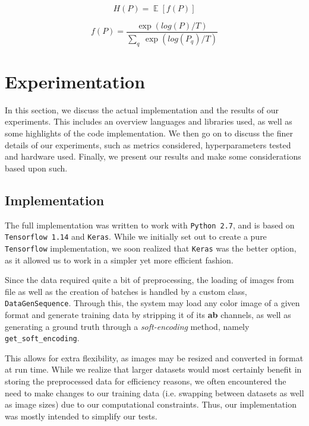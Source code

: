 \documentclass[twoside,twocolumn]{article}
\DeclareMathOperator{\EX}{\mathbb{E}}%
\begin{document}
\begin{equation}
H(P) = \EX[f(P)]
\end{equation}

\begin{equation}
f(P) = \frac{\exp(log(P)/T)}{\sum_q \: \exp(log(P_q)/T)}
\end{equation}

\newpage

\section{Experimentation}
In this section, we discuss the actual implementation and the results of our experiments. This includes an overview languages and libraries used, as well as some highlights of the code implementation. We then go on to discuss the finer details of our experiments, such as metrics considered, hyperparameters tested and hardware used. Finally, we present our results and make some considerations based upon such.


\subsection{Implementation}

The full implementation was written to work with \texttt{Python 2.7}, and is based on \texttt{Tensorflow 1.14} and \texttt{Keras}. While we initially set out to create a pure \texttt{Tensorflow} implementation, we soon realized that \texttt{Keras} was the better option, as it allowed us to work in a simpler yet more efficient fashion.

Since the data required quite a bit of preprocessing, the loading of images from file as well as the creation of batches is handled by a custom class, \texttt{DataGenSequence}. Through this, the system may load any color image of a given format and generate training data by stripping it of its \textbf{ab} channels, as well as generating a ground truth through a \textit{soft-encoding} method, namely \texttt{get\_soft\_encoding}.

This allows for extra flexibility, as images may be resized and converted in format at run time. While we realize that larger datasets would most certainly benefit in storing the preprocessed data for efficiency reasons, we often encountered the need to make changes to our training data (i.e. swapping between datasets as well as image sizes) due to our computational constraints. Thus, our implementation was mostly intended to simplify our tests.
\end{document}
